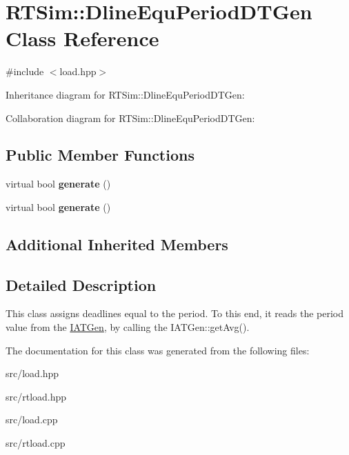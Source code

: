 \hypertarget{classRTSim_1_1DlineEquPeriodDTGen}{}\section{R\+T\+Sim\+:\+:Dline\+Equ\+Period\+D\+T\+Gen Class Reference}
\label{classRTSim_1_1DlineEquPeriodDTGen}


{\ttfamily \#include $<$load.\+hpp$>$}



Inheritance diagram for R\+T\+Sim\+:\+:Dline\+Equ\+Period\+D\+T\+Gen\+:


Collaboration diagram for R\+T\+Sim\+:\+:Dline\+Equ\+Period\+D\+T\+Gen\+:
\subsection*{Public Member Functions}
\begin{DoxyCompactItemize}
\item 
virtual bool {\bfseries generate} ()\hypertarget{classRTSim_1_1DlineEquPeriodDTGen_aec675cdd0fd3667025f8919c6901be86}{}\label{classRTSim_1_1DlineEquPeriodDTGen_aec675cdd0fd3667025f8919c6901be86}

\item 
virtual bool {\bfseries generate} ()\hypertarget{classRTSim_1_1DlineEquPeriodDTGen_a6f2860a4a6ee83bdf74d2f04083b3a0e}{}\label{classRTSim_1_1DlineEquPeriodDTGen_a6f2860a4a6ee83bdf74d2f04083b3a0e}

\end{DoxyCompactItemize}
\subsection*{Additional Inherited Members}


\subsection{Detailed Description}
This class assigns deadlines equal to the period. To this end, it reads the period value from the \hyperlink{classRTSim_1_1IATGen}{I\+A\+T\+Gen}, by calling the I\+A\+T\+Gen\+::get\+Avg(). 

The documentation for this class was generated from the following files\+:\begin{DoxyCompactItemize}
\item 
src/load.\+hpp\item 
src/rtload.\+hpp\item 
src/load.\+cpp\item 
src/rtload.\+cpp\end{DoxyCompactItemize}
